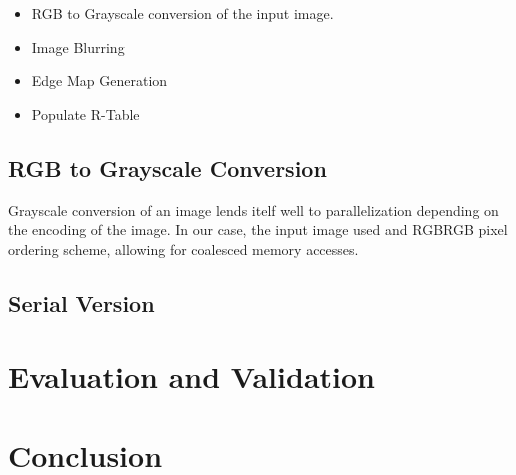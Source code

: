 \documentclass[conference]{IEEEtran}
\begin{document}
\begin{itemize}
  \item RGB to Grayscale conversion of the input image.
  \item Image Blurring 
  \item Edge Map Generation
  \item Populate R-Table
\end{itemize}

\subsection{RGB to Grayscale Conversion}
Grayscale conversion of an image lends itelf well to parallelization depending on the encoding of the image.
In our case, the input image used and RGBRGB pixel ordering scheme, allowing for coalesced memory accesses.



\subsection{Serial Version}



\section{Evaluation and Validation}



\section{Conclusion}




% 

\end{document}
